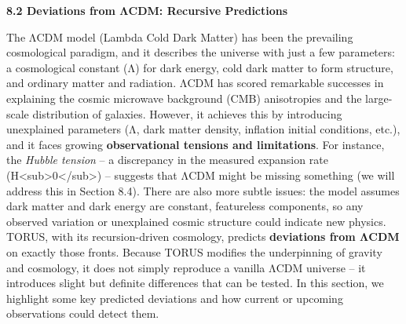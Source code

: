 \documentclass[
]{article}
\begin{document}
\textbf{8.2 Deviations from ΛCDM: Recursive Predictions}

The ΛCDM model (Lambda Cold Dark Matter) has been the prevailing
cosmological paradigm, and it describes the universe with just a few
parameters: a cosmological constant (Λ) for dark energy, cold dark
matter to form structure, and ordinary matter and radiation. ΛCDM has
scored remarkable successes in explaining the cosmic microwave
background (CMB) anisotropies and the large-scale distribution of
galaxies. However, it achieves this by introducing unexplained
parameters (Λ, dark matter density, inflation initial conditions, etc.),
and it faces growing \textbf{observational tensions and limitations}.
For instance, the \emph{Hubble tension} -- a discrepancy in the measured
expansion rate (H\textless sub\textgreater0\textless/sub\textgreater) --
suggests that ΛCDM might be missing something (we will address this in
Section 8.4). There are also more subtle issues: the model assumes dark
matter and dark energy are constant, featureless components, so any
observed variation or unexplained cosmic structure could indicate new
physics. TORUS, with its recursion-driven cosmology, predicts
\textbf{deviations from ΛCDM} on exactly those fronts. Because TORUS
modifies the underpinning of gravity and cosmology, it does not simply
reproduce a vanilla ΛCDM universe -- it introduces slight but definite
differences that can be tested. In this section, we highlight some key
predicted deviations and how current or upcoming observations could
detect them.
\end{document}
